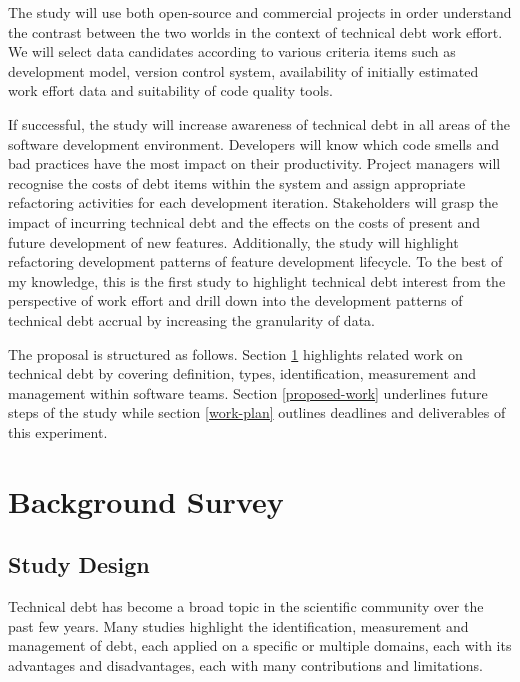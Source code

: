 \documentclass{mprop}
\begin{document}
The study will use both open-source and commercial projects in order understand
the contrast between the two worlds in the context of technical debt work
effort. We will select data candidates according to various criteria items such
as development model, version control system, availability of initially
estimated work effort data and suitability of code quality tools.

If successful, the study will increase awareness of technical debt in all areas
of the software development environment. Developers will know which code smells
and bad practices have the most impact on their productivity. Project managers
will recognise the costs of debt items within the system and assign appropriate
refactoring activities for each development iteration. Stakeholders will grasp
the impact of incurring technical debt and the effects on the costs of present
and future development of new features. Additionally, the study will highlight
refactoring development patterns of feature development lifecycle. To the best
of my knowledge, this is the first study to highlight technical debt interest
from the perspective of work effort and drill down into the development patterns
of technical debt accrual by increasing the granularity of data.

The proposal is structured as follows. Section \ref{lit-review} highlights
related work on technical debt by covering definition, types, identification,
measurement and management within software teams. Section \ref{proposed-work}
underlines future steps of the study while section \ref{work-plan} outlines
deadlines and deliverables of this experiment.

\section{Background Survey}
\label{lit-review}

\subsection{Study Design}

Technical debt has become a broad topic in the scientific community over the
past few years. Many studies highlight the identification, measurement and
management of debt, each applied on a specific or multiple domains, each with
its advantages and disadvantages, each with many contributions and limitations.
\end{document}
